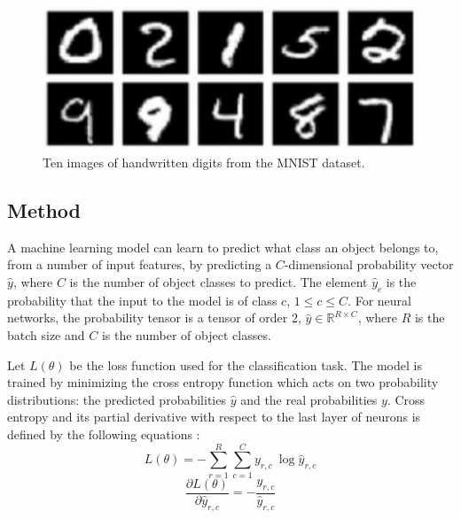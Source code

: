 \documentclass[a4paper, twoside]{article}
\newcommand*{\pd}[2]{\ensuremath{\dfrac{\partial #1}{\partial #2}}}
\begin{document}
\begin{figure}[h]
	\centering
  		\includegraphics[scale=1]{mnist.png}
  	\caption{Ten images of handwritten digits from the MNIST dataset. \cite{MNIST}} \label{figMNIST}
\end{figure}

\subsection{Method}
A machine learning model can learn to predict what class an object belongs to, from a number of input features, by predicting a $C$-dimensional probability vector $\hat{y}$, where $C$ is the number of object classes to predict. The element $\hat{y}_c$ is the probability that the input to the model is of class $c$, $1 \leq c \leq C$. For neural networks, the probability tensor is a tensor of order 2, $\hat{y} \in \mathbb{R}^{R \times C}$, where $R$ is the batch size and $C$ is the number of object classes.

Let $L(\theta)$ be the loss function used for the classification task. The model is trained by minimizing the cross entropy function which acts on two probability distributions: the predicted probabilities $\hat{y}$ and the real probabilities $y$. Cross entropy and its partial derivative with respect to the last layer of neurons is defined by the following equations \cite{cs231n} \cite{notesonbackprop}: 
\begin{equation}\label{crossentropy}
L(\theta) = - \sum^{R }_{r=1} \sum^{C }_{c=1}y_{r,c} \ \log{\hat{y}_{r,c}}
\end{equation}
\begin{equation}\label{dydxcrossentropy}
\pd{L(\theta)}{\hat{y}_{r,c}} = - \frac{y_{r,c}}{\hat{y}_{r,c}}
\end{equation}
\end{document}
